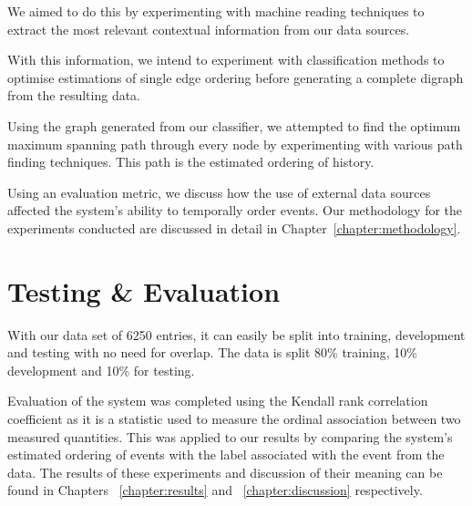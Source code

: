 \documentclass[bsc,frontabs,twoside,singlespacing,parskip,deptreport]{infthesis}     %
\begin{document}
We aimed to do this by experimenting with machine reading techniques to extract the most
relevant contextual information from our data sources.

With this information, we intend to experiment with classification methods to optimise estimations
of single edge ordering before generating a complete digraph from the resulting data.

Using the graph generated from our classifier, we attempted to find the optimum maximum spanning path
through every node by experimenting with various path finding techniques.
This path is the estimated ordering of history.


Using an evaluation metric, we discuss how the use of external data sources affected the system's ability to
temporally order events. Our methodology for the experiments conducted are discussed in detail in Chapter~\ref{chapter:methodology}.

\section{Testing \& Evaluation}
With our data set of 6250 entries, it can
easily be split into training, development and testing with no
need for overlap. The data is split 80\% training,
10\% development and 10\% for testing.

Evaluation of the system was completed using the
Kendall rank correlation coefficient as it is a statistic
used to measure the ordinal association between two
measured quantities. This was applied to our results
by comparing the system's estimated ordering of events
with the label associated with the event from the data.
The results of these experiments and discussion of their meaning can be found in Chapters ~\ref{chapter:results} and ~\ref{chapter:discussion} respectively. 
\end{document}
